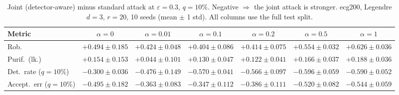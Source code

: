 \begin{table}[htbp]
  \centering
  \small
  \begin{tabular}{@{}lcccccc@{}}
    \toprule
    Metric & $\alpha{=}0$ & $\alpha{=}0.01$ & $\alpha{=}0.1$ & $\alpha{=}0.2$ & $\alpha{=}0.5$ & $\alpha{=}1$ \\
    \midrule
    Rob. & $+0.494 \pm 0.185$ & $+0.424 \pm 0.048$ & $+0.404 \pm 0.086$ & $+0.414 \pm 0.075$ & $+0.554 \pm 0.032$ & $+0.626 \pm 0.036$ \\
    Purif.\ (lk.) & $+0.154 \pm 0.153$ & $+0.044 \pm 0.101$ & $+0.130 \pm 0.047$ & $+0.122 \pm 0.041$ & $+0.166 \pm 0.037$ & $+0.188 \pm 0.036$ \\
    Det.\ rate ($q{=}10\%$) & $-0.300 \pm 0.036$ & $-0.476 \pm 0.149$ & $-0.570 \pm 0.041$ & $-0.566 \pm 0.097$ & $-0.596 \pm 0.059$ & $-0.590 \pm 0.052$ \\
    Accept.\ err ($q{=}10\%$) & $-0.495 \pm 0.182$ & $-0.363 \pm 0.083$ & $-0.347 \pm 0.112$ & $-0.386 \pm 0.111$ & $-0.520 \pm 0.082$ & $-0.544 \pm 0.059$ \\
    \bottomrule
  \end{tabular}
  \caption{Joint (detector-aware) minus standard attack at $\varepsilon=0.3$, $q{=}10\%$. Negative $\Rightarrow$ the joint attack is stronger. ecg200, Legendre $d{=}3$, $r{=}20$, 10 seeds (mean $\pm$ 1 std). All columns use the full test split.}
  \label{tab:ecg200_joint_r20_eps0.3}
\end{table}
